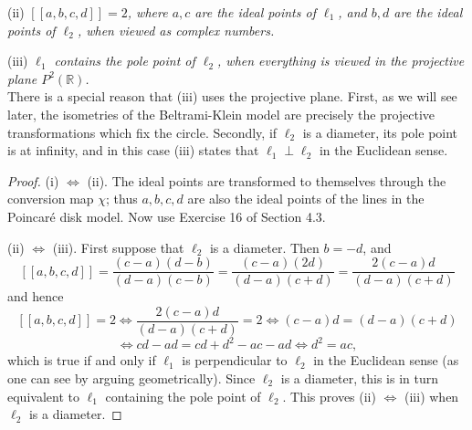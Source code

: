 \documentclass[leqno]{book}
\begin{document}
(ii) \emph{$[\![a,b,c,d]\!]=2$, where $a,c$ are the ideal points of $\ell_1$, and $b,d$ are the ideal points of $\ell_2$, when viewed as complex numbers.}

(iii) \emph{$\ell_1$ contains the pole point of $\ell_2$, when everything is viewed in the projective plane $P^2(\mathbb R)$.}\\

\noindent There is a special reason that (iii) uses the projective plane.  First, as we will see later, the isometries of the Beltrami-Klein model are precisely the projective transformations which fix the circle.  Secondly, if $\ell_2$ is a diameter, its pole point is at infinity, and in this case (iii) states that $\ell_1\perp\ell_2$ in the Euclidean sense.
\begin{proof}
(i) $\iff$ (ii). The ideal points are transformed to themselves through the conversion map $\chi$; thus $a,b,c,d$ are also the ideal points of the lines in the Poincar\'e disk model.  Now use Exercise 16 of Section 4.3.

(ii) $\iff$ (iii). First suppose that $\ell_2$ is a diameter.  Then $b=-d$, and
$$[\![a,b,c,d]\!]=\frac{(c-a)(d-b)}{(d-a)(c-b)}=\frac{(c-a)(2d)}{(d-a)(c+d)}=\frac{2(c-a)d}{(d-a)(c+d)}$$
and hence
$$[\![a,b,c,d]\!]=2\iff\frac{2(c-a)d}{(d-a)(c+d)}=2\iff(c-a)d=(d-a)(c+d)$$
$$\iff cd-ad=cd+d^2-ac-ad\iff d^2=ac,$$
which is true if and only if $\ell_1$ is perpendicular to $\ell_2$ in the Euclidean sense (as one can see by arguing geometrically).  Since $\ell_2$ is a diameter, this is in turn equivalent to $\ell_1$ containing the pole point of $\ell_2$.  This proves (ii) $\iff$ (iii) when $\ell_2$ is a diameter.


\end{proof}
\end{document}
